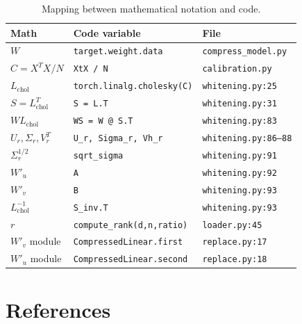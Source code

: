 \documentclass[11pt,a4paper]{article}
\theoremstyle{remark}
\begin{document}
\begin{table}[H]
\centering
\caption{Mapping between mathematical notation and code.}
\small
\begin{tabular}{@{}p{3cm}p{5.5cm}p{3.8cm}@{}}
\toprule
\textbf{Math} & \textbf{Code variable} & \textbf{File} \\
\midrule
$W$ & \texttt{target.weight.data} & \texttt{compress\_model.py} \\
$C = X^TX/N$ & \texttt{XtX / N} & \texttt{calibration.py} \\
$L_{\text{chol}}$
  & \texttt{torch.linalg.cholesky(C)} & \texttt{whitening.py:25} \\
$S = L_{\text{chol}}^T$ & \texttt{S = L.T} & \texttt{whitening.py:31} \\
$WL_{\text{chol}}$ & \texttt{WS = W @ S.T} & \texttt{whitening.py:83} \\
$U_r,\Sigma_r,V_r^T$
  & \texttt{U\_r, Sigma\_r, Vh\_r} & \texttt{whitening.py:86--88} \\
$\Sigma_r^{1/2}$ & \texttt{sqrt\_sigma} & \texttt{whitening.py:91} \\
$W'_u$ & \texttt{A} & \texttt{whitening.py:92} \\
$W'_v$ & \texttt{B} & \texttt{whitening.py:93} \\
$L_{\text{chol}}^{-1}$ & \texttt{S\_inv.T} & \texttt{whitening.py:93} \\
$r$ & \texttt{compute\_rank(d,n,ratio)} & \texttt{loader.py:45} \\
$W'_v$ module & \texttt{CompressedLinear.first} & \texttt{replace.py:17} \\
$W'_u$ module & \texttt{CompressedLinear.second} & \texttt{replace.py:18} \\
\bottomrule
\end{tabular}
\end{table}

\section*{References}
\end{document}
